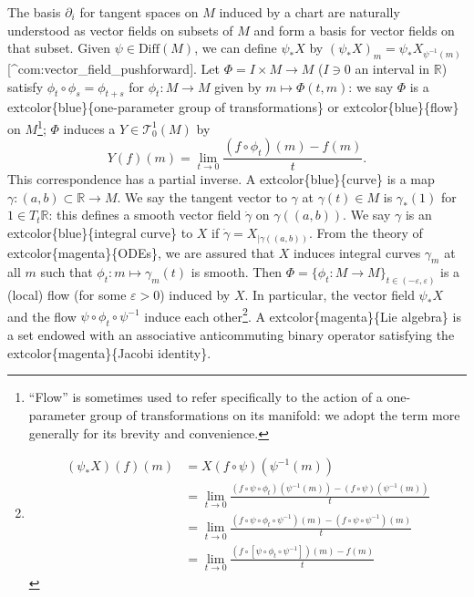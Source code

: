 \documentclass[
]{book}
\begin{document}
The basis \(\partial_i\) for tangent spaces on \(M\) induced by a chart are naturally understood as vector fields on subsets of \(M\) and form a basis for vector fields on that subset. Given \(\psi \in \text{Diff}(M)\), we can define \(\psi_* X\) by \((\psi_* X)_m = \psi_* X_{\psi^{-1}(m)}\) {[}\^{}com:vector\_field\_pushforward{]}.
Let \(\Phi = I \times M \to M\) (\(I \ni 0\) an interval in \(\mathbb{R}\)) satisfy \(\phi_t \circ \phi_s = \phi_{t+s}\) for \(\phi_t : M \to M\) given by \(m \mapsto \Phi(t,m)\): we say \(\Phi\) is a extcolor\{blue\}\{one-parameter group of transformations\} or extcolor\{blue\}\{flow\} on \(M\)\footnote{``Flow'' is sometimes used to refer specifically to the action of a one-parameter group of transformations on its manifold: we adopt the term more generally for its brevity and convenience.}; \(\Phi\) induces a \(Y \in \mathcal{T}_0^1(M)\) by
\begin{equation}     
    Y(f)(m) = \lim_{t \to 0}\frac{(f \circ \phi_t)(m) - f(m)}{t}. 
\end{equation}
This correspondence has a partial inverse.
A extcolor\{blue\}\{curve\} is a map \(\gamma : (a,b) \subset \mathbb{R} \to M\).
We say the tangent vector to \(\gamma\) at \(\gamma(t) \in M\) is \(\gamma_*(1)\) for \(1 \in T_t \mathbb{R}\): this defines a smooth vector field \(\dot{\gamma}\) on \(\gamma((a,b))\).
We say \(\gamma\) is an extcolor\{blue\}\{integral curve\} to \(X\) if \(\dot{\gamma} = X_{|\gamma((a,b))}\).
From the theory of extcolor\{magenta\}\{ODEs\}, we are assured that \(X\) induces integral curves \(\gamma_m\) at all \(m\) such that \(\phi_t : m \mapsto \gamma_m(t)\) is smooth.
Then \(\Phi = \{\phi_t : M \to M\}_{t\in(-\varepsilon,\varepsilon)}\) is a (local) flow (for some \(\varepsilon > 0\)) induced by \(X\).
In particular, the vector field \(\psi_* X\) and the flow \(\psi \circ \phi_t \circ \psi^{-1}\) induce each other\footnote{\begin{align*}
  (\psi_* X)(f)(m) &= X(f \circ \psi)(\psi^{-1}(m)) \\
  &= \lim_{t \to 0}\frac{(f \circ \psi \circ \phi_t)(\psi^{-1}(m)) - (f \circ \psi)(\psi^{-1}(m))}{t} \\
  &= \lim_{t \to 0}\frac{(f \circ \psi \circ \phi_t \circ \psi^{-1})(m) - (f \circ \psi \circ \psi^{-1})(m)}{t} \\
  &= \lim_{t \to 0}\frac{(f \circ [\psi \circ \phi_t \circ \psi^{-1}])(m) - f(m)}{t}
  \end{align*}}.
A extcolor\{magenta\}\{Lie algebra\} is a set endowed with an associative anticommuting binary operator satisfying the extcolor\{magenta\}\{Jacobi identity\}.
\end{document}
